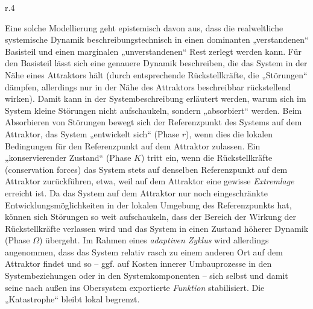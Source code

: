 \documentclass[11pt,a4paper]{article}
\begin{document}
\begin{wrapfigure}[17]{r}{.4\textwidth}
\end{wrapfigure}
Eine solche Modellierung geht epistemisch davon aus, dass die realweltliche
systemische Dynamik beschreibungstechnisch in einen dominanten „verstandenen“
Basisteil und einen marginalen „unverstandenen“ Rest zerlegt werden kann. Für
den Basisteil lässt sich eine genauere Dynamik beschreiben, die das System in
der Nähe eines Attraktors hält (durch entsprechende Rückstellkräfte, die
„Störungen“ dämpfen, allerdings nur in der Nähe des Attraktors beschreibbar
rückstellend wirken). Damit kann in der Systembeschreibung erläutert werden,
warum sich im System kleine Störungen nicht aufschaukeln, sondern „absorbiert“
werden. Beim Absorbieren von Störungen bewegt sich der Referenzpunkt des
Systems auf dem Attraktor, das System „entwickelt sich“ (Phase $r$), wenn dies
die lokalen Bedingungen für den Referenzpunkt auf dem Attraktor zulassen. Ein
„konservierender Zustand“ (Phase $K$) tritt ein, wenn die Rückstellkräfte
(conservation forces) das System stets auf denselben Referenzpunkt auf dem
Attraktor zurückführen, etwa, weil auf dem Attraktor eine gewisse
\emph{Extremlage} erreicht ist. Da das System auf dem Attraktor nur noch
eingeschränkte Entwicklungsmöglichkeiten in der lokalen Umgebung des
Referenzpunkts hat, können sich Störungen so weit aufschaukeln, dass der
Bereich der Wirkung der Rückstellkräfte verlassen wird und das System in einen
Zustand höherer Dynamik (Phase $\Omega$) übergeht. Im Rahmen eines
\emph{adaptiven Zyklus} wird allerdings angenommen, dass das System relativ
rasch zu einem anderen Ort auf dem Attraktor findet und so -- ggf. auf Kosten
innerer Umbauprozesse in den Systembeziehungen oder in den Systemkomponenten
-- sich selbst und damit seine nach außen ins Obersystem exportierte
\emph{Funktion} stabilisiert. Die „Katastrophe“ bleibt lokal begrenzt.
\end{document}
